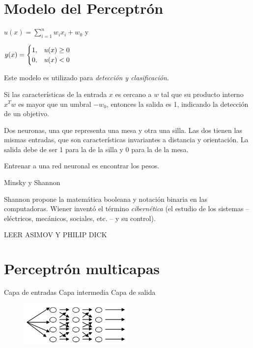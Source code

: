\section{Modelo del Perceptrón}

$
u(x) = \sum_{i=1}^{n} w_i x_i + w_0 
$
y

$
y(x) = \begin{cases}
1, \hspace{0.3cm} u(x) \geq 0    \\
0,\hspace{0.3cm}   u(x) < 0  
\end{cases}
$

Este modelo es utilizado para \textit{detección y clasificación}.

Si las características de la entrada $x$ es cercano a $w$ tal que su producto interno $x^Tw$ es mayor que un
umbral $-w_0$, entonces la salida es 1, indicando la detección de un objetivo.


\begin{ejemplo}
	Dos neuronas, una que representa una mesa y otra una silla.
	Las dos tienen las mismas entradas, que son características invariantes a distancia y orientación. La salida
	debe de ser 1 para la de la silla y 0 para la de la mesa.
\end{ejemplo}

\begin{nota} Entrenar a una red neuronal es encontrar los pesos. \end{nota}


Minsky y Shannon

Shannon propone la matemática booleana y notación binaria en las computadoras.
Wiener inventó el término \textit{cibernética} (el estudio de los sistemas – eléctricos, mecánicos, sociales, etc. – y su control).


LEER ASIMOV Y PHILIP DICK

\section{Perceptrón multicapas}

Capa de entradas
Capa intermedia
Capa de salida

\begin{figure}[h!]
	\centering
	\includegraphics[width=0.5\textwidth]{images/img76.png}
	\label{figura76}
\end{figure}

